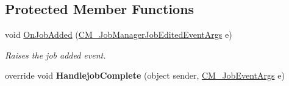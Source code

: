 \subsection*{Protected Member Functions}
\begin{DoxyCompactItemize}
\item 
void \hyperlink{class_c_m___job_manager_ae64a14d83bc4c6e0634b6469edbbef03}{On\+Job\+Added} (\hyperlink{class_c_m___job_manager_job_edited_event_args}{C\+M\+\_\+\+Job\+Manager\+Job\+Edited\+Event\+Args} e)
\begin{DoxyCompactList}\small\item\em Raises the job added event. \end{DoxyCompactList}\item 
\hypertarget{class_c_m___job_manager_a0c5d0104abdf10bda6af89301376792b}{}override void {\bfseries Handlejob\+Complete} (object sender, \hyperlink{class_c_m___job_event_args}{C\+M\+\_\+\+Job\+Event\+Args} e)\label{class_c_m___job_manager_a0c5d0104abdf10bda6af89301376792b}

\end{DoxyCompactItemize}
